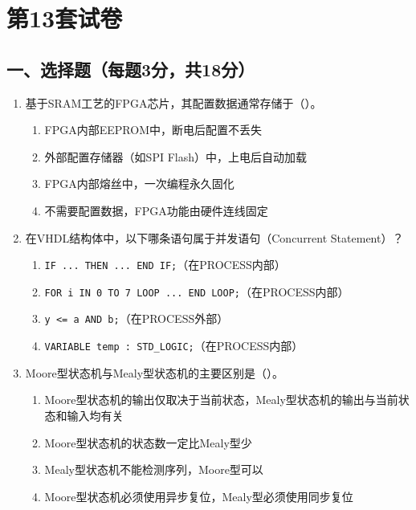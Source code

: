 \chapter{第13套试卷}

\section*{一、选择题（每题3分，共18分）}

\begin{enumerate}[label=\arabic*.]

\item 基于SRAM工艺的FPGA芯片，其配置数据通常存储于（\quad）。

\begin{enumerate}[label=\Alph*.]
  \item FPGA内部EEPROM中，断电后配置不丢失
  \item 外部配置存储器（如SPI Flash）中，上电后自动加载
  \item FPGA内部熔丝中，一次编程永久固化
  \item 不需要配置数据，FPGA功能由硬件连线固定
\end{enumerate}

\item 在VHDL结构体中，以下哪条语句属于并发语句（Concurrent Statement）？

\begin{enumerate}[label=\Alph*.]
  \item \texttt{IF ... THEN ... END IF;}（在PROCESS内部）
  \item \texttt{FOR i IN 0 TO 7 LOOP ... END LOOP;}（在PROCESS内部）
  \item \texttt{y <= a AND b;}（在PROCESS外部）
  \item \texttt{VARIABLE temp : STD\_LOGIC;}（在PROCESS内部）
\end{enumerate}

\item Moore型状态机与Mealy型状态机的主要区别是（\quad）。

\begin{enumerate}[label=\Alph*.]
  \item Moore型状态机的输出仅取决于当前状态，Mealy型状态机的输出与当前状态和输入均有关
  \item Moore型状态机的状态数一定比Mealy型少
  \item Mealy型状态机不能检测序列，Moore型可以
  \item Moore型状态机必须使用异步复位，Mealy型必须使用同步复位
\end{enumerate}


\end{enumerate}
